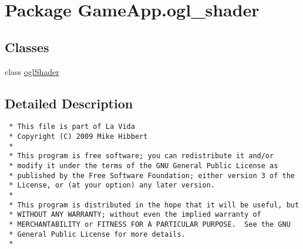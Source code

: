 \hypertarget{namespaceGameApp_1_1ogl__shader}{
\section{Package GameApp.ogl\_\-shader}
\label{namespaceGameApp_1_1ogl__shader}
}


\subsection*{Classes}
\begin{CompactItemize}
\item 
class \hyperlink{classGameApp_1_1ogl__shader_1_1oglShader}{oglShader}
\end{CompactItemize}


\subsection{Detailed Description}


\footnotesize\begin{verbatim}
 * This file is part of La Vida
 * Copyright (C) 2009 Mike Hibbert
 *
 * This program is free software; you can redistribute it and/or
 * modify it under the terms of the GNU General Public License as
 * published by the Free Software Foundation; either version 3 of the
 * License, or (at your option) any later version.
 *
 * This program is distributed in the hope that it will be useful, but
 * WITHOUT ANY WARRANTY; without even the implied warranty of
 * MERCHANTABILITY or FITNESS FOR A PARTICULAR PURPOSE.  See the GNU
 * General Public License for more details.
 *
\end{verbatim}
\normalsize
 
